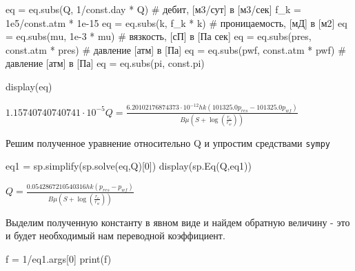 \documentclass[
  russian,
  letterpaper,
  DIV=11,
  numbers=noendperiod,
  oneside]{scrartcl}
\newenvironment{Shaded}{\begin{snugshade}}{\end{snugshade}}
\newcommand{\BuiltInTok}[1]{\textcolor[rgb]{0.00,0.23,0.31}{#1}}
\newcommand{\CommentTok}[1]{\textcolor[rgb]{0.37,0.37,0.37}{#1}}
\newcommand{\DecValTok}[1]{\textcolor[rgb]{0.68,0.00,0.00}{#1}}
\newcommand{\FloatTok}[1]{\textcolor[rgb]{0.68,0.00,0.00}{#1}}
\newcommand{\NormalTok}[1]{\textcolor[rgb]{0.00,0.23,0.31}{#1}}
\newcommand{\OperatorTok}[1]{\textcolor[rgb]{0.37,0.37,0.37}{#1}}
\begin{document}
\begin{Shaded}
\begin{Highlighting}[]
\NormalTok{eq }\OperatorTok{=}\NormalTok{ eq.subs(Q, }\DecValTok{1}\OperatorTok{/}\NormalTok{const.day }\OperatorTok{*}\NormalTok{ Q)  }\CommentTok{\# дебит, [м3/сут] в [м3/сек]}
\NormalTok{f\_k }\OperatorTok{=} \FloatTok{1e5}\OperatorTok{/}\NormalTok{const.atm }\OperatorTok{*} \FloatTok{1e{-}15} 
\NormalTok{eq }\OperatorTok{=}\NormalTok{ eq.subs(k, f\_k }\OperatorTok{*}\NormalTok{ k)     }\CommentTok{\# проницаемость, [мД] в [м2]}
\NormalTok{eq }\OperatorTok{=}\NormalTok{ eq.subs(mu, }\FloatTok{1e{-}3} \OperatorTok{*}\NormalTok{ mu)  }\CommentTok{\# вязкость, [сП] в [Па сек]}
\NormalTok{eq }\OperatorTok{=}\NormalTok{ eq.subs(pres, const.atm }\OperatorTok{*}\NormalTok{ pres) }\CommentTok{\# давление [атм] в [Па]}
\NormalTok{eq }\OperatorTok{=}\NormalTok{ eq.subs(pwf, const.atm }\OperatorTok{*}\NormalTok{ pwf) }\CommentTok{\# давление [атм] в [Па]}
\NormalTok{eq }\OperatorTok{=}\NormalTok{ eq.subs(pi, const.pi)}

\NormalTok{display(eq)}
\end{Highlighting}
\end{Shaded}

$\displaystyle 1.15740740740741 \cdot 10^{-5} Q = \frac{6.20102176874373 \cdot 10^{-12} h k \left(101325.0 p_{res} - 101325.0 p_{wf}\right)}{B \mu \left(S + \log{\left(\frac{r_{e}}{r_{w}} \right)}\right)}$

Решим полученное уравнение относительно Q и упростим средствами
\texttt{sympy}

\begin{Shaded}
\begin{Highlighting}[]
\NormalTok{eq1 }\OperatorTok{=}\NormalTok{ sp.simplify(sp.solve(eq,Q)[}\DecValTok{0}\NormalTok{])}
\NormalTok{display(sp.Eq(Q,eq1))}
\end{Highlighting}
\end{Shaded}

$\displaystyle Q = \frac{0.0542867210540316 h k \left(p_{res} - p_{wf}\right)}{B \mu \left(S + \log{\left(\frac{r_{e}}{r_{w}} \right)}\right)}$

Выделим полученную константу в явном виде и найдем обратную величину -
это и будет необходимый нам переводной коэффициент.

\begin{Shaded}
\begin{Highlighting}[]
\NormalTok{f }\OperatorTok{=} \DecValTok{1}\OperatorTok{/}\NormalTok{eq1.args[}\DecValTok{0}\NormalTok{]}
\BuiltInTok{print}\NormalTok{(f)}
\end{Highlighting}
\end{Shaded}
\end{document}
